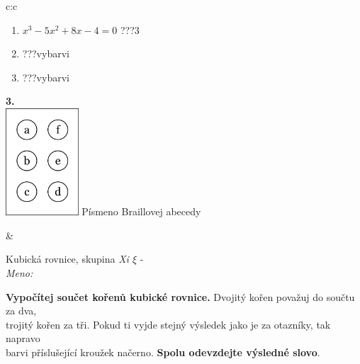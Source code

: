 \documentclass[10pt]{report}
\begin{document}
\begin{tabular}{c:c}
\begin{minipage}[c][104.5mm][t]{0.5\linewidth}
\begin{center}
\begin{minipage}{0.79\linewidth}
\begin{center}
\begin{varwidth}{\linewidth}
\begin{enumerate}
\item $x^3-5x^2+8x-4=0$\quad \dotfill\; ???\;\dotfill \quad $3$
\item \quad \dotfill\; ???\;\dotfill \quad vybarvi
\item \quad \dotfill\; ???\;\dotfill \quad vybarvi
\end{enumerate}
\end{varwidth}
\end{center}
\end{minipage}
\begin{minipage}{0.20\linewidth}
\begin{center}
{\Huge\bfseries 3.} \\[2mm]
\includegraphics[height=40mm]{../images/braille.png}
{\small Písmeno Braillovej abecedy}
\end{center}
\end{minipage}
\end{center}
\end{minipage}
&
\begin{minipage}[c][104.5mm][t]{0.5\linewidth}
\begin{center}
\vspace{7mm}
{\huge Kubická rovnice, skupina \textit{Xi $\xi$} -}\\[5mm]
\textit{Meno:}\phantom{xxxxxxxxxxxxxxxxxxxxxxxxxxxxxxxxxxxxxxxxxxxxxxxxxxxxxxxxxxxxxxxxx}\\[5mm]
\begin{minipage}{0.95\linewidth}
\textbf{Vypočítej součet kořenů kubické rovnice.} Dvojitý kořen považuj do součtu za dva,\\trojitý kořen za tři. Pokud ti vyjde stejný výsledek jako je za otazníky, tak napravo\\barvi příslušející kroužek načerno. \textbf{Spolu odevzdejte výsledné slovo}.
\end{minipage}
\\[1mm]
\begin{minipage}{0.79\linewidth}
\begin{center}
\begin{varwidth}{\linewidth}
\begin{enumerate}

\end{enumerate}
\end{varwidth}
\end{center}
\end{minipage}
\end{center}
\end{minipage}
\end{tabular}
\end{document}
